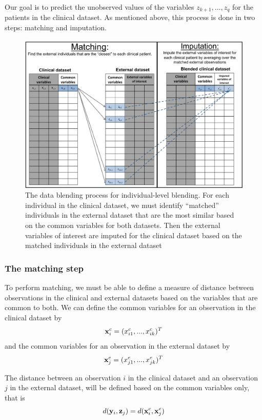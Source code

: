 \documentclass{article}
\begin{document}
Our goal is to predict the unobserved values of the variables $z_{k+1}, ..., z_q$ for the patients in the clinical dataset. As mentioned above, this process is done in two steps: matching and imputation.





\begin{figure}[H]
\begin{center}
\includegraphics[scale=0.45]{blending.png}
\end{center}
\caption{The data blending process for individual-level blending. For each individual in the clinical dataset, we must identify ``matched'' individuals in the external dataset that are the most similar based on the common variables for both datasets. Then the external variables of interest are imputed for the clinical dataset based on the matched individuals in the external dataset}
\label{fig:blend}
\end{figure}

\subsubsection{The matching step}

To perform matching, we must be able to define a measure of distance between observations in the clinical and external datasets based on the variables that are common to both. We can define the common variables for an observation in the clinical dataset by 
$${\bf x}_i^c = (x_{i1}^c, ..., x_{ik}^c)^T$$
and the common variables for an observation in the external dataset by
$${\bf x}_j^e = (x_{j1}^e, ..., x_{jk}^e)^T$$

The distance between an observation $i$ in the clinical dataset and an observation $j$ in the external dataset, will be defined based on the common variables only, that is
$$d({\bf y}_i, {\bf z}_j) = d({\bf x}_i^c, {\bf x}_j^e)$$
\end{document}
